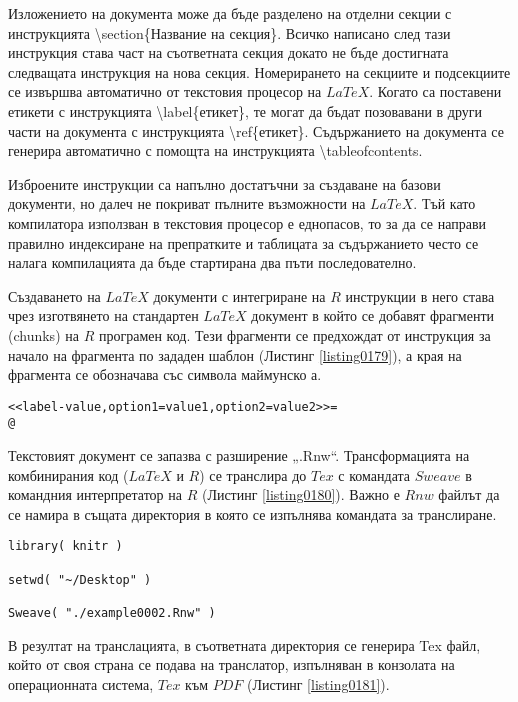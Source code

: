 Изложението на документа може да бъде разделено на отделни секции с инструкцията \textbackslash section\{Название на секция\}. Всичко написано след тази инструкция става част на съответната секция докато не бъде достигната следващата инструкция на нова секция. Номерирането на секциите и подсекциите се извършва автоматично от текстовия процесор на $LaTeX$. Когато са поставени етикети с инструкцията \textbackslash label\{етикет\}, те могат да бъдат позовавани в други части на документа с инструкцията \textbackslash ref\{етикет\}. Съдържанието на документа се генерира автоматично с помощта на инструкцията \textbackslash tableofcontents.

Изброените инструкции са напълно достатъчни за създаване на базови документи, но далеч не покриват пълните възможности на $LaTeX$. Тъй като компилатора използван в текстовия процесор е еднопасов, то за да се направи правилно индексиране на препратките и таблицата за съдържанието често се налага компилацията да бъде стартирана два пъти последователно. 

Създаването на $LaTeX$ документи с интегриране на $R$ инструкции в него става чрез изготвянето на стандартен $LaTeX$ документ в който се добавят фрагменти (chunks) на $R$ програмен код. Тези фрагменти се предхождат от инструкция за начало на фрагмента по зададен шаблон (Листинг \ref{listing0179}), а края на фрагмента се обозначава със символа маймунско $а$.

\begin{lstlisting}[caption=Инструкция за R фрагмент в LaTeX документ, label=listing0179]
<<label-value,option1=value1,option2=value2>>=
@
\end{lstlisting}

Текстовият документ се запазва с разширение „.Rnw“. Трансформацията на комбинирания код ($LaTeX$ и $R$) се транслира до $Tex$ с командата $Sweave$ в командния интерпретатор на $R$ (Листинг \ref{listing0180}). Важно е $Rnw$ файлът да се намира в същата директория в която се изпълнява командата за транслиране. 

\begin{lstlisting}[caption=Транслиране от Rnw до Tex, label=listing0180]
library( knitr )

setwd( "~/Desktop" )

Sweave( "./example0002.Rnw" )
\end{lstlisting}

В резултат на транслацията, в съответната директория се генерира Tex файл, който от своя страна се подава на транслатор, изпълняван в конзолата на операционната система, $Tex$ към $PDF$ (Листинг \ref{listing0181}).


